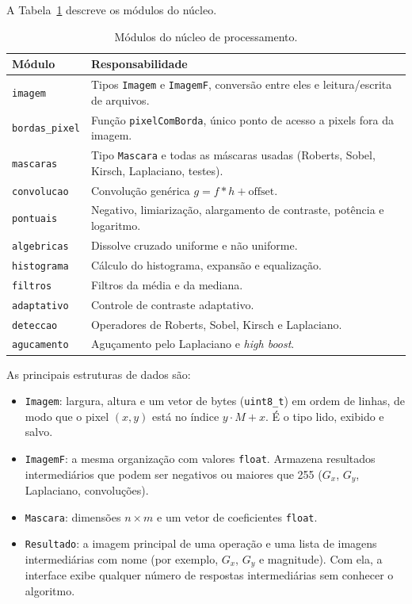 \documentclass[11pt,a4paper]{article}
\begin{document}
A Tabela~\ref{tab:modulos} descreve os módulos do núcleo.

\begin{table}[H]
\centering
\small
\begin{tabularx}{\textwidth}{lX}
\toprule
\textbf{Módulo} & \textbf{Responsabilidade} \\
\midrule
\texttt{imagem} & Tipos \texttt{Imagem} e \texttt{ImagemF}, conversão entre eles e leitura/escrita de arquivos. \\
\texttt{bordas\_pixel} & Função \texttt{pixelComBorda}, único ponto de acesso a pixels fora da imagem. \\
\texttt{mascaras} & Tipo \texttt{Mascara} e todas as máscaras usadas (Roberts, Sobel, Kirsch, Laplaciano, testes). \\
\texttt{convolucao} & Convolução genérica $g = f * h + \text{offset}$. \\
\texttt{pontuais} & Negativo, limiarização, alargamento de contraste, potência e logaritmo. \\
\texttt{algebricas} & Dissolve cruzado uniforme e não uniforme. \\
\texttt{histograma} & Cálculo do histograma, expansão e equalização. \\
\texttt{filtros} & Filtros da média e da mediana. \\
\texttt{adaptativo} & Controle de contraste adaptativo. \\
\texttt{deteccao} & Operadores de Roberts, Sobel, Kirsch e Laplaciano. \\
\texttt{agucamento} & Aguçamento pelo Laplaciano e \textit{high boost}. \\
\bottomrule
\end{tabularx}
\caption{Módulos do núcleo de processamento.}
\label{tab:modulos}
\end{table}

As principais estruturas de dados são:
\begin{itemize}
  \item \texttt{Imagem}: largura, altura e um vetor de bytes (\texttt{uint8\_t}) em ordem de
        linhas, de modo que o pixel $(x, y)$ está no índice $y \cdot M + x$. É o tipo lido,
        exibido e salvo.
  \item \texttt{ImagemF}: a mesma organização com valores \texttt{float}. Armazena resultados
        intermediários que podem ser negativos ou maiores que 255 ($G_x$, $G_y$, Laplaciano,
        convoluções).
  \item \texttt{Mascara}: dimensões $n \times m$ e um vetor de coeficientes \texttt{float}.
  \item \texttt{Resultado}: a imagem principal de uma operação e uma lista de imagens
        intermediárias com nome (por exemplo, $G_x$, $G_y$ e magnitude). Com ela, a interface
        exibe qualquer número de respostas intermediárias sem conhecer o algoritmo.
\end{itemize}
\end{document}
